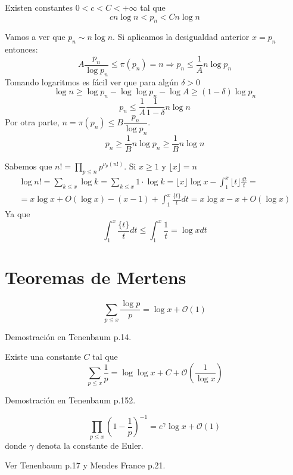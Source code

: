 \documentclass[TAN.tex]{subfiles}
\begin{document}
\begin{coro}
Existen constantes $0<c<C<+∞$ tal que
\[ c n \log n < p_n < C n \log n \]
\end{coro}
\begin{dem}
Vamos a ver que $p_n \sim n \log n$. Si aplicamos la desigualdad anterior $x=p_n$ entonces:
$$
A\frac{p_n}{\log p_n} \leq \pi(p_n) = n \Rightarrow p_n \leq \frac{1}{A}n\log p_n 
$$
Tomando logaritmos es fácil ver que para algún $\delta >0$
$$
\log n \geq \log p_n - \log \log p_n - \log A \geq (1-\delta) \log p_n$$ 
$$
p_n \leq \frac{1}{A}\frac{1}{1-\delta}n \log n$$
Por otra parte, $n = \pi(p_n) \leq B \dfrac{p_n}{\log p_n}$.
$$p_n \geq \frac{1}{B}n\log p_n \geq \frac{1}{B}n \log n$$
\end{dem}

\begin{dem}
Sabemos que $n! = \prod_{p\leq n} p^{\nu_p(n!)}$. Si $x\geq 1$ y $\lfloor x \rfloor = n$
\begin{gather*}
\log n! = \sum_{k\leq x} \log k = \sum_{k \leq x} 1 \cdot \log k = \lfloor x \rfloor\log x - \int_1^x \lfloor t \rfloor \frac{dt}{t} = \\ =
x\log x + O(\log x) - (x-1) + \int_1^x\frac{\{t\}}{t}dt =  x\log x - x  + O(\log x)
\end{gather*}
Ya que 
$$
 \int_1^x\frac{\{t\}}{t}dt  \leq  \int_1^x\frac{1}{t} = \log xdt 
$$
\end{dem}

\section{Teoremas de Mertens}
\begin{teorema}
\[ \sum_{p≤x} \frac{\log p}{p} = \log x + \mathcal{O}(1) \]
\end{teorema}
Demostración en Tenenbaum p.14.

\begin{teorema}[Mertens]
Existe una constante $C$ tal que
\[ \sum_{p≤x} \frac{1}{p} = \log \log x + C + \mathcal{O}\left(\frac{1}{\log x}\right) \]
\end{teorema}
Demostración en Tenenbaum p.152.

\begin{teorema}
\[ \prod_{p≤x} \left(1-\frac{1}{p}\right)^{-1} = e^γ\log x + \mathcal{O}(1) \]
donde $γ$ denota la constante de Euler.
\end{teorema}
Ver Tenenbaum p.17 y Mendes France p.21.
\end{document}

